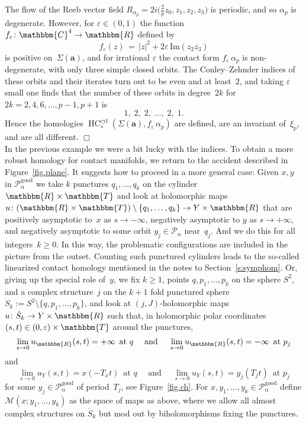 \documentclass[12pt,twoside]{amsart}
\def\cyl{\operatorname{cyl}}
\def\good{\operatorname{good}}
\theoremstyle{plain}
\numberwithin{figure}{section}
\numberwithin{equation}{section}
\newcommand{\proofend}{\hspace*{\fill} $\Box$\\}
\def\aa{\boldsymbol{a}}
\def\HC{\operatorname{HC}}
\def\ga{\alpha}
\def\gve{\varepsilon}
\def\cm{{\mathcal M}}
\def\cp{{\mathcal P}}
\def\CC{\mathbbm{C}}
\def\RR{\mathbbm{R}}
\def\TT{\mathbbm{T}}
\begin{document}
The flow of the Reeb vector field 
$R_{\ga_p} = 2i \bigl( \frac{2}{p} z_0, z_1, z_2,z_3 \bigr)$ is periodic, 
and so $\ga_p$ is degenerate.
However, for $\gve \in (0,1)$ the function $f_\gve \colon \CC^4 \to \RR$
defined by
$$
f_\gve (z) \,=\, |z|^2 + 2\gve \,\mbox{Im} (z_2 \overline{z_3})
$$
is positive on~$\Sigma (\aa)$, and for irrational $\gve$ the contact form
$f_\gve \,\ga_p$ is non-degenerate, with only three simple closed orbits.
%
The Conley--Zehnder indices of these orbits and their iterates
turn out to be even and at least~$2$, 
and taking $\gve$ small one finds that the number of these orbits in degree~$2k$ for 
$2k = 2, 4, 6, \dots, p-1, p+1$ is
$$
1,\; 2,\; 2, \; \dots, \; 2, \; 1 .
$$
Hence the homologies $\HC_*^{\cyl} (\Sigma (\aa), f_\gve \,\ga_p)$ are defined, 
are an invariant of~$\xi_p$, 
and are all different.
\proofend


In the previous example we were a bit lucky with the indices. 
To obtain a more robust homology for contact manifolds,
we return to the accident described in Figure~\ref{fig.plane}.
It suggests how to proceed in a more general case:
Given $x,y$ in $\cp_{\ga}^{\good}$ we take $k$ punctures $q_1, \dots, q_k$ on the cylinder
$\RR \times \TT$ and look at holomorphic maps 
$u \colon (\RR \times \TT) \setminus \{ q_1, \dots, q_k \} \to Y \times \RR$ 
that are positively asymptotic to~$x$ as $s \to -\infty$, 
negatively asymptotic to $y$ as $s \to + \infty$,
and negatively asymptotic to some orbit $y_j \in \cp_\ga$ near~$q_j$.
And we do this for all integers~$k \geqslant 0$.
In this way, the problematic configurations are included in the picture from the outset.
Counting such punctured cylinders leads to the so-called linearized contact homology
mentioned in the notes to Section~\ref{s:symphom}.
%
Or, giving up the special role of~$y$, 
we fix $k \geqslant 1$, points $q, p_1, \dots, p_k$ on the sphere $S^2$, 
and a complex structure~$j$ on the $k+1$ fold punctured sphere 
$\dot S_k := S^2 \setminus \{q, p_1, \dots, p_k \}$,
and look at $(j,J)$-holomorphic maps 
$u \colon \dot S_k \to Y \times \RR$ such that, 
in holomorphic polar coordinates 
$(s,t) \in (0,\gve) \times \TT$ around the punctures, 
$$
\lim_{s \to 0} u_{\RR}(s,t) = +\infty \,\mbox{ at~$q$} 
\quad \mbox{ and } \quad
\lim_{s \to 0} u_{\RR}(s,t) = -\infty \,\mbox{ at~$p_j$} 
$$
and
$$
\lim_{s \to 0} u_Y(s,t) = x (-T_xt) \,\mbox{ at~$q$} 
\quad \mbox{ and } \quad
\lim_{s \to 0} u_Y(s,t) = y_j (T_jt) \,\mbox{ at~$p_j$} 
$$
for some $y_j \in \cp_\ga^{\good}$ of period~$T_j$, see Figure~\ref{fig.ch}.
%
For $x, y_1, \dots, y_k \in \cp_\ga^{\good}$ define $\cm (x; y_1, \dots, y_k)$
as the space of maps as above, where we allow all almost complex structures
on $\dot S_k$ but mod out by biholomorphisms fixing the punctures.
\end{document}
